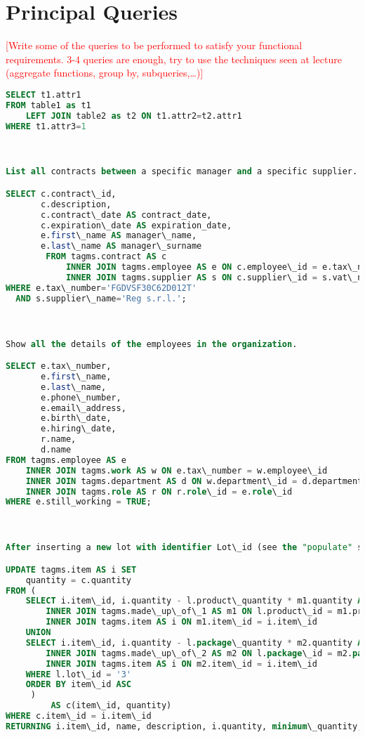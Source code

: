 \section{Principal Queries}
\textcolor{red}{[Write some of the queries to be performed to satisfy your functional requirements. 3-4 queries are enough, try to use the techniques seen at lecture (aggregate functions, group by, subqueries,…)]}

\begin{lstlisting}[language=SQL,
keywordstyle=\color{blue},
stringstyle=\color{mauve},
showstringspaces=false,
basicstyle=\ttfamily\footnotesize]
SELECT t1.attr1
FROM table1 as t1
    LEFT JOIN table2 as t2 ON t1.attr2=t2.attr1 
WHERE t1.attr3=1



List all contracts between a specific manager and a specific supplier.

SELECT c.contract\_id,
       c.description,
       c.contract\_date AS contract_date,
       c.expiration\_date AS expiration_date,
       e.first\_name AS manager\_name,
       e.last\_name AS manager\_surname
		FROM tagms.contract AS c
		    INNER JOIN tagms.employee AS e ON c.employee\_id = e.tax\_number
		    INNER JOIN tagms.supplier AS s ON c.supplier\_id = s.vat\_number
WHERE e.tax\_number='FGDVSF30C62D012T'
  AND s.supplier\_name='Reg s.r.l.';



Show all the details of the employees in the organization.

SELECT e.tax\_number,
       e.first\_name,
       e.last\_name,
       e.phone\_number,
       e.email\_address,
       e.birth\_date,
       e.hiring\_date,
       r.name,
       d.name
FROM tagms.employee AS e
    INNER JOIN tagms.work AS w ON e.tax\_number = w.employee\_id
    INNER JOIN tagms.department AS d ON w.department\_id = d.department\_id
    INNER JOIN tagms.role AS r ON r.role\_id = e.role\_id
WHERE e.still_working = TRUE;



After inserting a new lot with identifier Lot\_id (see the "populate" section), decrease the quantity of the items involved in the production of a lot.

UPDATE tagms.item AS i SET
    quantity = c.quantity
FROM (
    SELECT i.item\_id, i.quantity - l.product\_quantity * m1.quantity AS quantity FROM tagms.lot AS l
        INNER JOIN tagms.made\_up\_of\_1 AS m1 ON l.product\_id = m1.product\_id
        INNER JOIN tagms.item AS i ON m1.item\_id = i.item\_id
    UNION
    SELECT i.item\_id, i.quantity - l.package\_quantity * m2.quantity AS quantity FROM tagms.lot AS l
        INNER JOIN tagms.made\_up\_of\_2 AS m2 ON l.package\_id = m2.package\_id
        INNER JOIN tagms.item AS i ON m2.item\_id = i.item\_id
    WHERE l.lot\_id = '3'
    ORDER BY item\_id ASC
     )
         AS c(item\_id, quantity)
WHERE c.item\_id = i.item\_id
RETURNING i.item\_id, name, description, i.quantity, minimum\_quantity, item\_category\_id;




\end{lstlisting}
